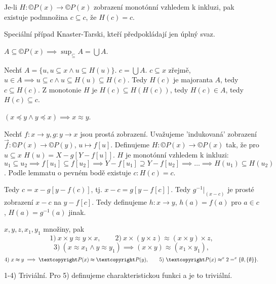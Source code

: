 \documentclass[12pt]{article}                   %
\begin{document}
    \begin{lemma}
        Je-li $H: ©P(x) \rightarrow ©P(x)$ zobrazení monotónní vzhledem k inkluzi, pak existuje podmnožina $c \subseteq c$, že $H(c) = c$.

        \begin{poznamkain}
            Speciální případ Knaster-Tarski, kteří předpokládají jen úplný svaz.
        \end{poznamkain}

        \begin{pozorovaniin}
            $A \subseteq ©P(x) \implies \sup_{\subseteq} A = \bigcup A$.
        \end{pozorovaniin}

        \begin{dukazin}
            Nechť $A = \{u, u \subseteq x \land u \subseteq H(u)\}$. $c = \bigcup A$. $c \subseteq x$ zřejmě, $u \in A \implies u \subseteq c \land u \subseteq H(u) \subseteq H(c)$. Tedy $H(c)$ je majoranta $A$, tedy $c \subseteq H(c)$. Z monotonie $H$ je $H(c) \subseteq H(H(c))$, tedy $H(c) \in A$, tedy $H(c)\subseteq c$.
        \end{dukazin}
    \end{lemma}

    \begin{veta}
        $(x \preceq y \land y \preceq x) \implies x \approx y$.
        
        \begin{dukazin}
            Nechť $f: x \rightarrow y, g: y \rightarrow x$ jsou prostá zobrazení. Uvažujeme 'indukovaná' zobrazení $\vec{f}: ©P(x) \rightarrow ©P(y)$, $u \mapsto f[u]$. Definujeme $H: ©P(x) \rightarrow ©P(x)$ tak, že pro $u \subseteq x$ $H(u) = X - g[Y-f[u]]$. $H$ je monotónní vzhledem k inkluzi: $u_1 \subseteq u_2 \implies f[u_1] \subseteq f[u_2] \implies Y - f[u_1] \supseteq Y - f[u_2] \implies … \implies H(u_1) \subseteq H(u_2)$. Podle lemmatu o pevném bodě existuje $c: H(c) = c$.

            Tedy $c = x - g[y - f(c)]$, tj. $x - c = g[y - f[c]]$. Tedy $g^{-1}|_{(x - c)}$ je prosté zobrazení $x - c$ na $y - f[c]$. Tedy definujeme $h: x \rightarrow y$, $h(a) = f(a)$ pro $a \in c$, $H(a) = g^{-1}(a)$ jinak.
        \end{dukazin}
    \end{veta}

    \begin{lemma}
        $x, y, z, x_1, y_1$ množiny, pak
        $$ 1)\ x\times y \approx y \times x, \qquad 2)\ x \times (y \times z) \approx (x \times y) \times z, $$
        $$ 3)\ (x \approx x_1 \land y \approx y_1) \implies (x\times y) \approx (x_1 \times y_1), $$
        $$ 4)\ x \approx y \implies ©P(x) \approx ©P(y), \qquad 5)\ ©P(x) \approx ^x2 = ^x\{\O, \{\O\}\}. $$

        \begin{dukazin}
            1-4) Triviální. Pro 5) definujeme charakteristickou funkci a je to triviální.
        \end{dukazin}
    \end{lemma}
\end{document}
